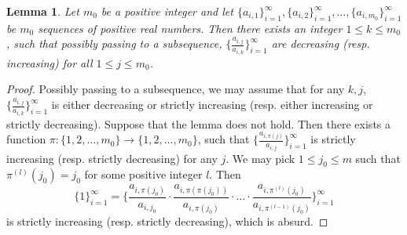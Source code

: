 \documentclass[11pt]{amsart}
\numberwithin{equation}{section}
\newcommand\han[1]{\todo[color=yellow!40]{#1}} %
\newtheorem{lem}[thm]{Lemma}
\theoremstyle{definition}
\theoremstyle{definition}
\begin{document}
\begin{lem}\label{lem: quotient sequences acc}
Let $m_0$ be a positive integer and let $\{a_{i,1}\}_{i=1}^{\infty},\{a_{i,2}\}_{i=1}^{\infty},\dots,\{a_{i,m_0}\}_{i=1}^{\infty}$ be $m_0$ sequences of positive real numbers. Then there exists an integer $1\leq k\leq m_0$, such that possibly passing to a subsequence, $\{\frac{a_{i,j}}{a_{i,k}}\}_{i=1}^{\infty}$ are decreasing (resp. increasing) for all $1\leq j\leq m_0$.
\end{lem}
\begin{proof}
Possibly passing to a subsequence, we may assume that for any $k,j$, $\{\frac{a_{i,j}}{a_{i,k}}\}_{i=1}^{\infty}$ is either decreasing or strictly increasing (resp. either increasing or strictly decreasing). Suppose that the lemma does not hold. Then there exists a function $\pi:\{1,2,\dots,m_0\}\rightarrow\{1,2,\dots,m_0\}$, such that $\{\frac{a_{i,\pi(j)}}{a_{i,j}}\}_{i=1}^{\infty}$ is strictly increasing (resp. strictly decreasing) for any $j$. We may pick $1\leq j_0\leq m$ such that $\pi^{(l)}(j_0)=j_0$ for some positive integer $l$. Then
$$\{1\}_{i=1}^{\infty}=\{\frac{a_{i,\pi(j_0)}}{a_{i,j_0}}\cdot\frac{a_{i,\pi(\pi(j_0))}}{a_{i,\pi(j_0)}}\cdot\dots\cdot \frac{a_{i,\pi^{(l)}(j_0)}}{a_{i,\pi^{(l-1)}(j_0)}}\}_{i=1}^{\infty}$$
is strictly increasing (resp. strictly decreasing), which is absurd.
\end{proof}
\end{document}

